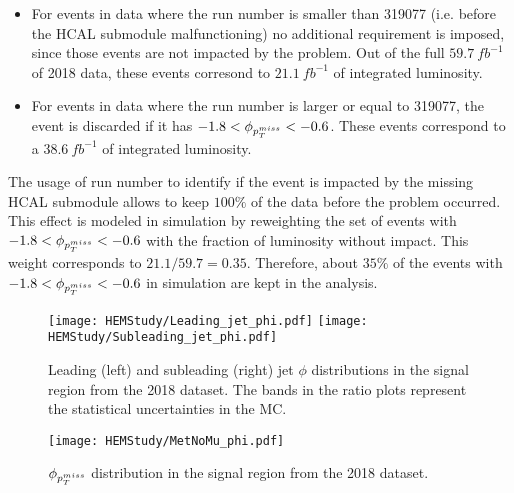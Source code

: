 \begin{itemize}
    \item For events in data where the run number is smaller than 319077 (i.e. before the HCAL submodule malfunctioning)
    no additional requirement is imposed, since those events are not impacted by the problem. Out of the full $59.7 \ fb^{-1}$
    of 2018 data, these events corresond to $21.1 \ fb^{-1}$ of integrated luminosity.
    \item For events in data where the run number is larger or equal to 319077, the event is discarded
    if it has $-1.8 < \phi_{p_T^{miss}} < -0.6$. These events correspond to a $38.6 \ fb^{-1}$ of integrated luminosity. 
\end{itemize}

The usage of run number to identify if the event is impacted by the missing HCAL submodule allows to keep $100\%$ of the data   
before the problem occurred. This effect is modeled in simulation by reweighting the set of events with $-1.8 < \phi_{p_T^{miss}} < -0.6$
with the fraction of luminosity without impact. This weight corresponds to $21.1 / 59.7 = 0.35$. Therefore, about $35\%$ of the events
with $-1.8 < \phi_{p_T^{miss}} < -0.6$ in simulation are kept in the analysis.

\begin{figure}[htbp]
    \begin{center}
        \texttt{[image: HEMStudy/Leading\_jet\_phi.pdf]}
        \texttt{[image: HEMStudy/Subleading\_jet\_phi.pdf]}
    \end{center}
    \caption{Leading (left) and subleading (right) jet $\phi$ distributions in the signal region from the 2018 dataset.
    The bands in the ratio plots represent the statistical uncertainties in the MC.}
    \label{fig:sr_2018_noHemCut_jetlead}
\end{figure}

\begin{figure}[htbp]
    \begin{center}
        \texttt{[image: HEMStudy/MetNoMu\_phi.pdf]}
    \end{center}
    \caption{$\phi_{p_T^{miss}}$ distribution in the signal region from the 2018 dataset.}
    \label{fig:sr_2018_noHemCut_met}
\end{figure}

\clearpage